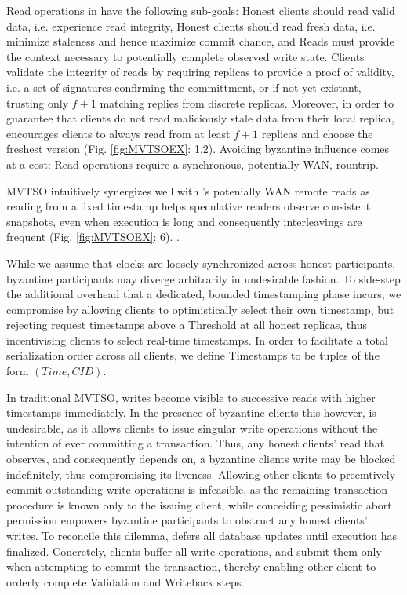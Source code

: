 Read operations in \sys have the following sub-goals: \one Honest clients should read valid data, i.e. experience read integrity, \two Honest clients should read fresh data, i.e. minimize staleness and hence maximize commit chance, and \three Reads must provide the context necessary to potentially complete observed write state. 
Clients validate the integrity of reads by requiring replicas to provide a proof of validity, i.e. a set of signatures confirming the committment, or if not yet existant, trusting  only $f+1$ matching replies from discrete replicas. Moreover, in order to guarantee that clients do not read maliciously stale data from their local replica, \sys encourages clients to always read from at least $f+1$ replicas and choose the freshest version (Fig. \ref{fig:MVTSOEX}: 1,2).
Avoiding byzantine influence comes at a cost: Read operations require a synchronous, potentially WAN, rountrip. 

MVTSO intuitively synergizes well with \sys{}'s potenially WAN remote reads as reading from a fixed timestamp helps speculative readers observe consistent snapshots, even when execution is long and consequently interleavings are frequent (Fig. \ref{fig:MVTSOEX}: 6). .

While we assume that clocks are loosely synchronized across honest participants, byzantine participants may diverge arbitrarily in undesirable fashion. To side-step the additional overhead that a dedicated, bounded timestamping phase \cite{Clairvoyant} incurs, we compromise by allowing clients to optimistically select their own timestamp, but rejecting request timestamps above a Threshold at all honest replicas, thus incentivising clients to select real-time timestamps. In order to facilitate a total serialization order across all clients, we define Timestamps to be tuples of the form $(Time, CID)$. 

In traditional MVTSO, writes become visible to successive reads with higher timestamps immediately. In the presence of byzantine clients this however, is undesirable, as it allows clients to issue singular write operations without the intention of ever committing a transaction. Thus, any honest clients' read that observes, and consequently depends on, a byzantine clients write may be blocked indefinitely, thus compromising its liveness.
Allowing other clients to preemtively commit outstanding write operations is infeasible, as the remaining transaction procedure is known only to the issuing client, while conceiding pessimistic abort permission empowers byzantine participants to obstruct any honest clients' writes. 
To reconcile this dilemma, \sys{} defers all database updates until execution has finalized. Concretely, \sys clients buffer all write operations, and submit them only when attempting to commit the transaction, thereby enabling other \sys client to orderly complete Validation and Writeback steps. 

